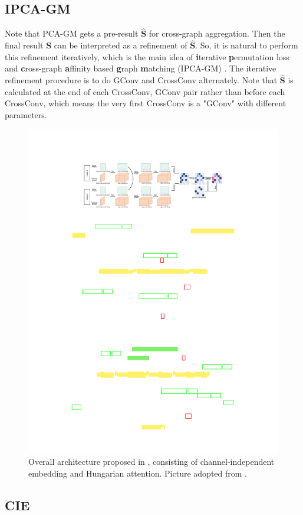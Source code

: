 \documentclass[a4paper]{article}
\begin{document}
\subsection{IPCA-GM}
Note that PCA-GM gets a pre-result $\hat{\mathbf{S}}$ for cross-graph aggregation. Then the final result $\mathbf{S}$ can be interpreted as a refinement of $\hat{\mathbf{S}}$. So, it is natural to perform this refinement iteratively, which is the main idea of \textbf{i}terative \textbf{p}ermutation loss and \textbf{c}ross-graph \textbf{a}ffinity based \textbf{g}raph \textbf{m}atching (IPCA-GM) \cite{pca-ipca}. The iterative refinement procedure is to do GConv and CrossConv alternately. Note that $\hat{\mathbf{S}}$ is calculated at the end of each CrossConv, GConv pair rather than before each CrossConv, which means the very first CrossConv is a "GConv" with different parameters.

\begin{figure}[htbp]
    \centering
    \includegraphics[width=0.85\linewidth]{Images/cie.pdf}
    \caption{Overall architecture proposed in \cite{cie}, consisting of channel-independent embedding and Hungarian attention. Picture adopted from \cite{cie}.}
\end{figure}
\subsection{CIE}
\end{document}
